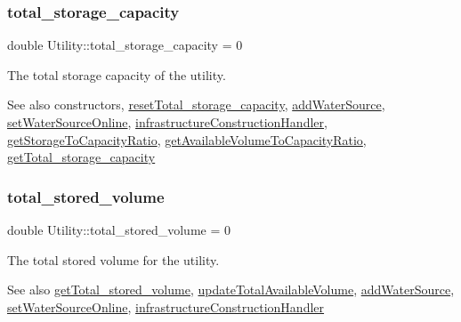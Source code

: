 \subsubsection{\texorpdfstring{total\+\_\+storage\+\_\+capacity}{total\_storage\_capacity}}
{\footnotesize\ttfamily double Utility\+::total\+\_\+storage\+\_\+capacity = 0\hspace{0.3cm}{\ttfamily [private]}}



The total storage capacity of the utility. 

\begin{DoxySeeAlso}{See also}
constructors, \mbox{\hyperlink{classUtility_a0ac180e13fb963a29c2860664c3f352a}{reset\+Total\+\_\+storage\+\_\+capacity}}, \mbox{\hyperlink{classUtility_aebbfd65c13e86cfeda8bdfbcc6712587}{add\+Water\+Source}}, \mbox{\hyperlink{classUtility_ae01127adf3c99415310e77b22bd9f3b5}{set\+Water\+Source\+Online}}, \mbox{\hyperlink{classUtility_ae93114986578d3d3fbae56f271ac7df6}{infrastructure\+Construction\+Handler}}, \mbox{\hyperlink{classUtility_a0e27f2877c780e214c6dda06d03246fe}{get\+Storage\+To\+Capacity\+Ratio}}, \mbox{\hyperlink{classUtility_a70f24df5a7d4346ad0ebccd9b30960d3}{get\+Available\+Volume\+To\+Capacity\+Ratio}}, \mbox{\hyperlink{classUtility_a16f8269dc5f80c1d079c49f33495f620}{get\+Total\+\_\+storage\+\_\+capacity}} 
\end{DoxySeeAlso}
\mbox{\label{classUtility_af4557d0aba0d4eebbd39ca5fd04ceb30}} 
\subsubsection{\texorpdfstring{total\+\_\+stored\+\_\+volume}{total\_stored\_volume}}
{\footnotesize\ttfamily double Utility\+::total\+\_\+stored\+\_\+volume = 0\hspace{0.3cm}{\ttfamily [private]}}



The total stored volume for the utility. 

\begin{DoxySeeAlso}{See also}
\mbox{\hyperlink{classUtility_a5d932aef9e201e824ac681cd6928613a}{get\+Total\+\_\+stored\+\_\+volume}}, \mbox{\hyperlink{classUtility_af394fe9f04a371a7cf10ddadba575e85}{update\+Total\+Available\+Volume}}, \mbox{\hyperlink{classUtility_aebbfd65c13e86cfeda8bdfbcc6712587}{add\+Water\+Source}}, \mbox{\hyperlink{classUtility_ae01127adf3c99415310e77b22bd9f3b5}{set\+Water\+Source\+Online}}, \mbox{\hyperlink{classUtility_ae93114986578d3d3fbae56f271ac7df6}{infrastructure\+Construction\+Handler}} 
\end{DoxySeeAlso}
\mbox{\label{classUtility_a61b0a5f18047ef928506660a48cbbb70}} 
